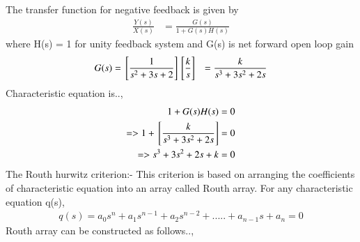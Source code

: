\begin{enumerate}[label=\thesection.\arabic*.,ref=\thesection.\theenumi]
\solution The transfer function for negative feedback is given by
\begin{align}
\frac{Y(s)}{X(s)} &= \frac{G(s)}{1+G(s)H(s)}
\end{align}
where H(s) = 1 for unity feedback system
and G(s) is net forward open loop gain
\begin{align}
G(s) &=  {}\left[\frac{1}{s^2+3s+2}\right]{}\left[\frac{k}{s}\right]
&= \frac{k}{s^3+3s^2+2s}
\end{align}
Characteristic equation is..,
\begin{align}
 1 + G(s)H(s) = 0 \label{eq:sec_order_op}
\\
=> 1 + {}\left[\frac{k}{s^3+3s^2+2s}\right] = 0
\\
=> s^3+3s^2+2s+k = 0
\end{align}
The Routh hurwitz criterion:-
This criterion is based on arranging the coefficients of characteristic equation into an array called Routh array.
For any characteristic equation q(s),
\begin{align}
q(s) = a_0s^n+a_1s^{n-1}+a_2s^{n-2}+.....+a_{n-1}s+a_n = 0
\end{align}
Routh array can be constructed as follows..,
 

\end{enumerate}
